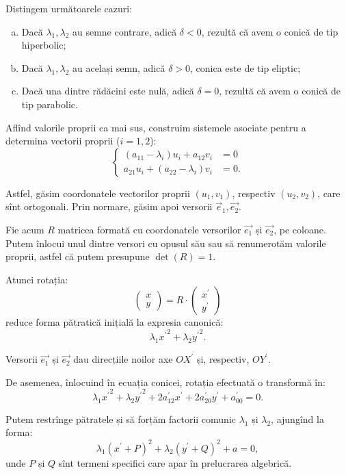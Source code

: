 Distingem următoarele cazuri:
\begin{enumerate}[(a)]
	\item Dacă $\lambda_1, \lambda_2$ au semne contrare, adică $\delta < 0$,
rezultă că avem o conică de tip hiperbolic;
    \item Dacă $\lambda_1, \lambda_2$ au același semn, adică $\delta > 0$,
conica este de tip eliptic;
    \item Dacă una dintre rădăcini este nulă, adică $\delta = 0$, rezultă că
avem o conică de tip parabolic.
\end{enumerate}

Aflînd valorile proprii ca mai sus, construim sistemele asociate pentru a 
determina vectorii proprii ($i = 1, 2$): 
 \[
	\begin{cases}	
	    (a_{11} - \lambda_i) u_i + a_{12} v_i &= 0 \\
	    a_{21} u_i + (a_{22} - \lambda_i) v_i &= 0.
    \end{cases}
\]

Astfel, găsim coordonatele vectorilor proprii $(u_1, v_1)$, respectiv 
$(u_2, v_2)$, care sînt ortogonali. Prin normare, găsim apoi versorii
$\vec{e}_1, \vec{e_2}$.

Fie acum $R$ matricea formată cu coordonatele versorilor $\vec{e_1}$ și 
$\vec{e_2}$, pe coloane. Putem înlocui unul dintre versori cu opusul său sau
să renumerotăm valorile proprii, astfel că putem presupune $\det(R) = 1$.

Atunci rotația: 
 \[
	\begin{pmatrix}
	    x \\
	    y
    \end{pmatrix} = R \cdot \begin{pmatrix}
	                            x^{\prime} \\
	                            y^{\prime}
                            \end{pmatrix}
\]
reduce forma pătratică inițială la expresia canonică: 
 \[
	\lambda_1 {x^{\prime}}^2 + \lambda_2 {y^{\prime}}^2.
\]

Versorii $\vec{e_1}$ și $\vec{e_2}$ dau direcțiile noilor axe $OX^{\prime}$ și,
respectiv, $OY^{\prime}$.

De asemenea, înlocuind în ecuația conicei, rotația efectuată o transformă în: 
 \[
	\lambda_1 {x^{\prime}}^2 + \lambda_2 {y^{\prime}}^2 + 
	2a_{12}^{\prime} x^{\prime} + 2a^{\prime}_{20} y^{\prime} +
	a_{00}^{\prime} = 0.
\]

Putem restrînge pătratele și să forțăm factorii comunic $\lambda_1$ și 
$\lambda_2$, ajungînd la forma: 
 \[
	\lambda_1 (x^{\prime} + P)^2 + \lambda_2(y^{\prime} + Q)^2 + a = 0,
\]
unde $P$ și $Q$ sînt termeni specifici care apar în prelucrarea algebrică.

